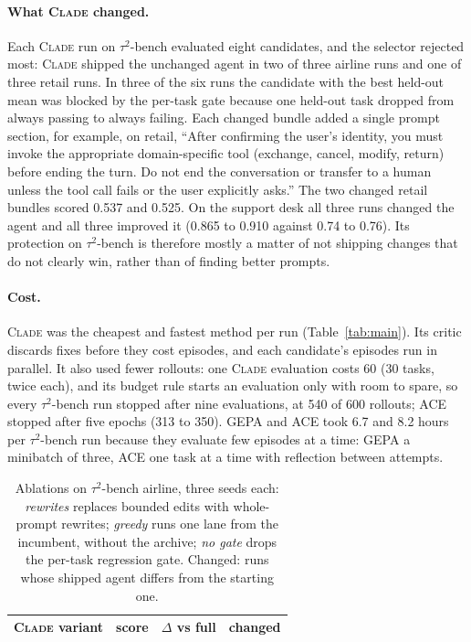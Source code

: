 \documentclass[11pt]{article}
\newcommand{\clade}{\textsc{Clade}\xspace}
\newcommand{\taub}{$\tau^2$-bench\xspace}
\begin{document}
\paragraph{What \clade changed.} Each \clade run on \taub evaluated eight candidates, and the selector rejected most:
\clade shipped the unchanged agent in two of three airline runs and one of three retail runs. In three of the six
runs the candidate with the best held-out mean was blocked by the per-task gate because one held-out task dropped
from always passing to always failing. Each changed bundle added a single prompt section, for
example, on retail, ``After confirming the user's identity, you must invoke the appropriate domain-specific tool
(exchange, cancel, modify, return) before ending the turn. Do not end the conversation or transfer to a human unless
the tool call fails or the user explicitly asks.'' The two changed retail bundles scored 0.537 and 0.525. On the
support desk all three runs changed the agent and all three improved it (0.865 to 0.910 against 0.74 to 0.76). Its
protection on \taub is therefore mostly a matter of not shipping changes that do not clearly win, rather than of
finding better prompts.

\paragraph{Cost.} \clade was the cheapest and fastest method per run (Table~\ref{tab:main}). Its
critic discards fixes before they cost episodes, and each candidate's episodes run in parallel. It also used fewer
rollouts: one \clade evaluation costs 60 (30 tasks, twice each), and its budget rule starts an evaluation only with
room to spare, so every \taub run stopped after nine evaluations, at 540 of 600 rollouts; ACE stopped after five
epochs (313 to 350). GEPA and ACE took 6.7 and 8.2 hours per \taub run because they
evaluate few episodes at a time: GEPA a minibatch of three, ACE one task at a time with reflection between attempts.

\begin{table}[t]
\centering
\small
\setlength{\tabcolsep}{3pt}
\begin{tabular}{lccc}
\toprule
\clade variant & score & $\Delta$ vs full & changed \\
\midrule

\end{tabular}
\caption{Ablations on \taub airline, three seeds each: \emph{rewrites} replaces bounded edits with whole-prompt rewrites; \emph{greedy} runs one lane from the incumbent, without the archive; \emph{no gate} drops the per-task regression gate. Changed: runs whose shipped agent differs from the starting one.}
\label{tab:ablation}
\end{table}
\end{document}
